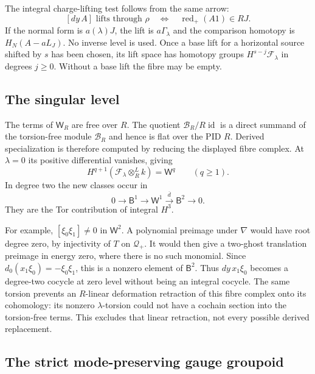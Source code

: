 The integral charge-lifting test follows from the same arrow:
\begin{equation}\label{eq:vol2-integral-lift-test}
 [dy\,A]\text{ lifts through }\rho
 \quad\Longleftrightarrow\quad
 \operatorname{red}_+(A1)\in RJ.
\end{equation}
If the normal form is $a(\lambda)J$, the lift is
$a\Gamma_\lambda$ and the comparison homotopy is
$H_N(A-aL_J)$. No inverse level is used. Once a base lift for
a horizontal source shifted by $s$ has been chosen, its lift
space has homotopy groups $H^{s-j}\mathcal F_\lambda$ in
degrees $j\geq0$. Without a base lift the fibre may be empty.

\subsection{The singular level}

The terms of $\mathsf W_R$ are free over $R$.
The quotient $\mathcal B_R/R\operatorname{id}$ is a direct
summand of the torsion-free module $\mathcal B_R$ and hence is
flat over the PID $R$. Derived specialization is therefore
computed by reducing the displayed fibre complex. At $\lambda=0$
its positive differential vanishes, giving
\begin{equation}\label{eq:vol2-zero-level-fibre}
 H^{q+1}(\mathcal F_\lambda\otimes_R^Lk)=\mathsf W^q
                              \qquad(q\geq1).
\end{equation}
In degree two the new classes occur in
\[
 0\longrightarrow\mathsf B^1\longrightarrow\mathsf W^1
      \xrightarrow{\overline d}\mathsf B^2\longrightarrow0.
\]
They are the Tor contribution of integral $H^3$.

For example, $[\xi_0\xi_1]\ne0$ in $\mathsf W^2$.
A polynomial preimage under $\nabla$ would have root degree
zero, by injectivity of $T$ on $\mathcal Q_+$. It would then
give a two-ghost translation preimage in energy zero, where
there is no such monomial. Since
$d_0(x_1\xi_0)=-\xi_0\xi_1$, this is a nonzero element of
$\mathsf B^2$. Thus $dy\,x_1\xi_0$ becomes a degree-two
cocycle at zero level without being an integral cocycle.
The same torsion prevents an $R$-linear deformation retraction
of this fibre complex onto its cohomology: its nonzero
$\lambda$-torsion could not have a cochain section into the
torsion-free terms. This excludes that linear retraction,
not every possible derived replacement.

\subsection{The strict mode-preserving gauge groupoid}

